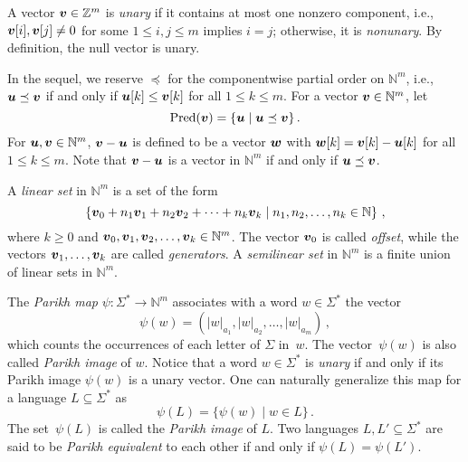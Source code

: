 \documentclass[11pt]{article}
\newcommand{\Pred}{\ensuremath{\mathrm{Pred}}}
\def\Vec#1{\mbox{\boldmath $#1$}}
\begin{document}
A vector $\Vec{v} \in \mathbb{Z}^m$ is {\it unary} if it contains at most one nonzero component, i.e., $\Vec{v}[i], \Vec{v}[j] \neq 0$ for some $1 \le i, j \le m$ implies $i = j$; otherwise, it is {\it nonunary}. 
By definition, the null vector is unary. 


In the sequel, we reserve $\preceq$ for the componentwise partial order on $\mathbb{N}^m$, i.e., $\Vec{u} \preceq \Vec{v}$ if and only if $\Vec{u}[k] \le \Vec{v}[k]$ for all $1 \le k \le m$. 
For a vector $\Vec{v} \in \mathbb{N}^m$, let 
\[
\Pred(\Vec{v}) = \{\Vec{u} \mid \Vec{u} \preceq \Vec{v}\}\,.
\] 
For $\Vec{u}, \Vec{v} \in \mathbb{N}^m$, $\Vec{v} - \Vec{u}$ is defined to be a vector $\Vec{w}$ with $\Vec{w}[k] = \Vec{v}[k] - \Vec{u}[k]$ for all $1 \le k \le m$. 
Note that $\Vec{v} - \Vec{u}$ is a vector in $\mathbb{N}^m$ if and only if $\Vec{u} \preceq \Vec{v}$. 

\medskip

A \emph{linear set} in $\mathbb{N}^m$ is a set of the form
\begin{equation}
\left\{\Vec{v}_0 + n_1\Vec{v}_1+n_2 \Vec{v}_2 +\cdots+n_k\Vec{v}_k \mid n_1, n_2,\ldots, n_k \in \mathbb{N}\right\}\,,\label{eq:linear}
\end{equation}
where $k\geq 0$ and $\Vec{v}_0, \Vec{v}_1, \Vec{v}_2, \ldots, \Vec{v}_k \in \mathbb{N}^m$. 
The vector $\Vec{v}_0$ is called \emph{offset}, while the vectors $\Vec{v}_1, \ldots, \Vec{v}_k$
are called \emph{generators}.
A \emph{semilinear set} in $\mathbb{N}^m$ is a finite union of linear sets in $\mathbb{N}^m$.

\medskip

The {\it Parikh map} $\psi: \Sigma^* \to \mathbb{N}^m$ associates with a word $w \in \Sigma^*$ the vector
\[
\psi(w)=\left(|w|_{a_1}, |w|_{a_2}, \ldots, |w|_{a_m}\right)\,, 
\]
which counts the occurrences of each letter of $\Sigma$ in~$w$. The vector~$\psi(w)$ is also called \emph{Parikh image} of $w$.
Notice that a word $w\in\Sigma^*$ is {\it unary} if and only if its Parikh image $\psi(w)$ is a unary vector.
One can naturally generalize this map for a language $L \subseteq \Sigma^*$ as
\[
\psi(L) = \{\psi(w) \mid w \in L\}\,.
\]
The set~$\psi(L)$ is called the \emph{Parikh image} of $L$. 
Two languages $L, L' \subseteq \Sigma^*$ are said to be {\it Parikh equivalent} to each other if and only if $\psi(L) = \psi(L')$.

\medskip
\end{document}
